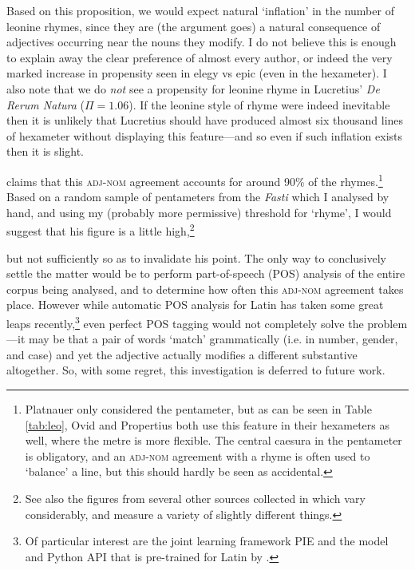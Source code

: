 \documentclass[twocolumn, switch, a4paper]{article} %
\begin{document}
Based on this proposition, we would expect natural `inflation' in the number
of leonine rhymes, since they are (the argument goes) a natural consequence of
adjectives occurring near the nouns they modify. I do not believe this is
enough to explain away the clear preference of almost every author, or indeed
the very marked increase in propensity seen in elegy vs epic (even in the
hexameter). I also note that we do \emph{not} see a propensity for leonine
rhyme in Lucretius' \emph{De Rerum Natura} ($\Pi=1.06$). If the leonine style
of rhyme were indeed inevitable then it is unlikely that Lucretius should have
produced almost six thousand lines of hexameter without displaying this
feature---and so even if such inflation exists then it is slight.

 claims that this \textsc{adj}-\textsc{nom} agreement accounts
for around 90\% of the rhymes.\footnote{
  Platnauer only considered the pentameter, but as can be seen in Table
  \ref{tab:leo}, Ovid and Propertius both use this feature in their hexameters
  as well, where the metre is more flexible. The central caesura in the
  pentameter is obligatory, and an \textsc{adj}-\textsc{nom} agreement with a
  rhyme is often used to `balance' a line, but this should hardly be seen as
  accidental.
}
Based on a random sample of pentameters from the \emph{Fasti} which I analysed by
hand, and using my (probably more permissive) threshold for `rhyme', I would
suggest that his figure is a little high,\footnote{
  See also the figures from several other sources collected in  which vary considerably, and measure a variety
  of slightly different things.
}

but not sufficiently so as to invalidate his point. The only way to
conclusively settle the matter would be to perform part-of-speech (POS)
analysis of the entire corpus being analysed, and to determine how often this
\textsc{adj}-\textsc{nom} agreement takes place. However while automatic POS
analysis for Latin has taken some great leaps recently,\footnote{
  Of particular interest are the joint learning framework PIE
  \cite{manjavacas-etal-2019-improving} and the model and Python API that is
  pre-trained for Latin by .
}
even perfect POS tagging would not completely solve the problem---it may
be that a pair of words `match' grammatically (i.e. in number, gender, and
case) and yet the adjective actually modifies a different substantive
altogether. So, with some regret, this investigation is deferred to future
work.
\end{document}

